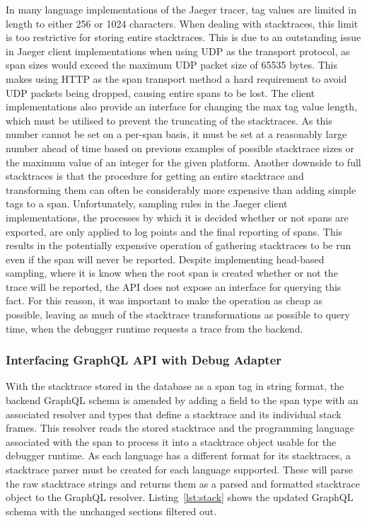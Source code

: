 \documentclass[12pt,pdftex,titlepage]{report}
\begin{document}
                    In many language implementations of the Jaeger tracer, tag values are limited in length to either 256 or 1024 characters. When dealing with stacktraces, this limit is too 
                    restrictive for storing entire stacktraces. This is due to an outstanding issue in Jaeger client implementations when using UDP as the transport protocol, as span sizes
                    would exceed the maximum UDP packet size of 65535 bytes\cite{udptagsize}. This makes using HTTP as the span transport method a hard requirement to avoid UDP packets being
                    dropped, causing entire spans to be lost. The client implementations also provide an interface for changing the max tag value length, which must be utilised to prevent the truncating
                    of the stacktraces. As this number cannot be set on a per-span basis, it must be set at a reasonably large number ahead of time based on previous examples of possible stacktrace sizes
                    or the maximum value of an integer for the given platform. Another downside to full stacktraces is that the procedure for getting an entire stacktrace and transforming them can often 
                    be considerably more expensive than adding simple tags to a span. Unfortunately, sampling rules in the Jaeger client implementations, the processes by which it is decided whether or 
                    not spans are exported, are only applied to log points and the final reporting of spans. This results in the potentially expensive operation of gathering stacktraces to be run even if 
                    the span will never be reported. Despite implementing head-based sampling, where it is know when the root span is created whether or not the trace will be reported, the API does not 
                    expose an interface for querying this fact. For this reason, it was important to make the operation as cheap as possible, leaving as much of the stacktrace transformations as possible to 
                    query time, when the debugger runtime requests a trace from the backend.

                \subsubsection{Interfacing GraphQL API with Debug Adapter}
                    With the stacktrace stored in the database as a span tag in string format, the backend GraphQL schema is amended by adding a field to the span type with an associated resolver and 
                    types that define a stacktrace and its individual stack frames. This resolver reads the stored stacktrace and the programming language associated with the span to process it into a 
                    stacktrace object usable for the debugger runtime. As each language has a different format for its stacktraces, a stacktrace parser must be created for each language supported. These
                    will parse the raw stacktrace strings and returns them as a parsed and formatted stacktrace object to the GraphQL resolver. Listing~\ref{lst:stack} shows the updated GraphQL schema
                    with the unchanged sections filtered out. 
\end{document}
